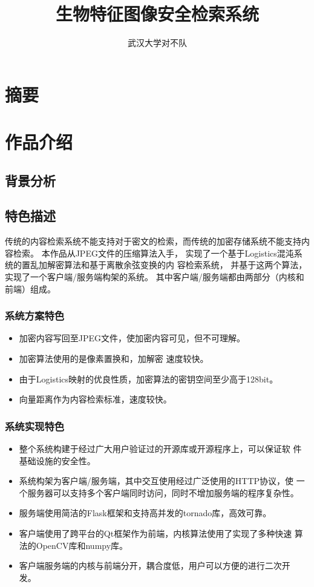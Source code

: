 \documentclass[12pt, titlepage]{ctexrep}
\author{武汉大学对不队}
\title{生物特征图像安全检索系统}
\begin{document}
\tableofcontents

\chapter{摘要}
\label{chap:abstract}

\chapter{作品介绍}
\label{chap:intro}

\section{背景分析}
\label{sec:bkg-analysis}

\section{特色描述}
\label{sec:spec-description}

传统的内容检索系统不能支持对于密文的检索，而传统的加密存储系统不能支持内容检索。
本作品从JPEG文件的压缩算法入手，
实现了一个基于Logistics混沌系统的置乱加解密算法和基于离散余弦变换的内
容检索系统，
并基于这两个算法，实现了一个客户端/服务端构架的系统。
其中客户端/服务端都由两部分（内核和前端）组成。

\subsection{系统方案特色}
\label{sec:sys-design-spec}
\begin{itemize}
\item 加密内容写回至JPEG文件，使加密内容可见，但不可理解。
\item 加密算法使用的是像素置换和，加解密  速度较快。
\item 由于Logistics映射的优良性质\cite{li2011}，加密算法的密钥空间至少高于128bit。
\item 向量距离作为内容检索标准，速度较快。
\end{itemize}

\subsection{系统实现特色}
\label{sec:sys-impl-spec}
\begin{itemize}
\item 整个系统构建于经过广大用户验证过的开源库或开源程序上，可以保证软
  件基础设施的安全性。
\item 系统构架为客户端/服务端，其中交互使用经过广泛使用的HTTP协议，使
  一个服务器可以支持多个客户端同时访问，同时不增加服务端的程序复杂性。
\item 服务端使用简洁的Flask框架和支持高并发的tornado库，高效可靠。
\item 客户端使用了跨平台的Qt框架作为前端，内核算法使用了实现了多种快速
  算法的OpenCV库和numpy库。
\item 客户端服务端的内核与前端分开，耦合度低，用户可以方便的进行二次开
  发。
\end{itemize}
\end{document}
